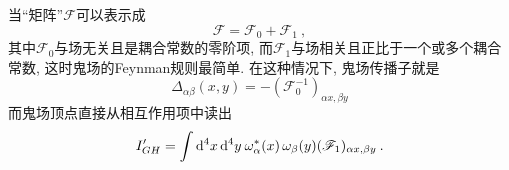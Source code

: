 当``矩阵''$\mathscr{F}$可以表示成
\begin{equation}
\mathscr{F}=\mathscr{F}_{0}+\mathscr{F}_{1}\:,   \label{15.6.5}
\end{equation}%
其中$\mathscr{F}_{0}$与场无关且是耦合常数的零阶项,
而$\mathscr{F}_{1}$与场相关且正比于一个或多个耦合常数, 这时鬼场的Feynman规则最简单. 在这种情况下, 
鬼场传播子就是%
\begin{equation}
\Delta _{\alpha \beta }(x,y)=-(\mathscr{F}_{0}^{-1})_{\alpha x,\beta y} \label{15.6.6}
\end{equation}%
而鬼场顶点直接从相互作用项中读出
\begin{equation}
I_{GH}^{\prime }=\int \mathrm{d}^{4}x\,\mathrm{d}^{4}y\:\omega _{\alpha }^{\ast }(x)\,\omega _{\beta
}(y)(\mathscr{F}_{1})_{\alpha x,\beta y}\:.   \label{15.6.7}
\end{equation}


